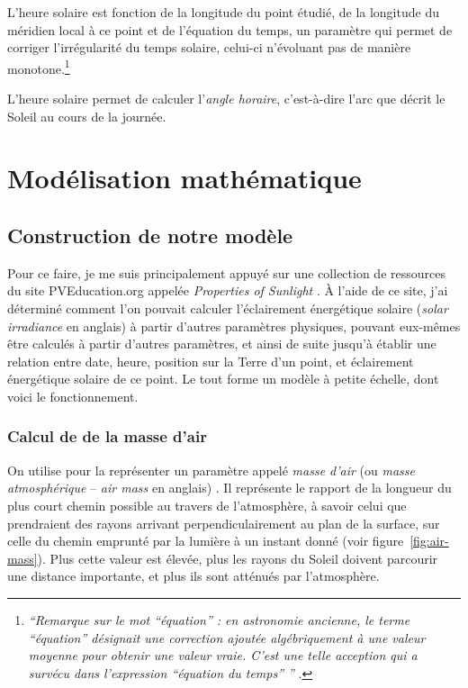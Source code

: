 \documentclass[12pt]{article}
\begin{document}
L'heure solaire est fonction de la longitude du point étudié, de la longitude du méridien local à ce point et de l'équation du temps, un paramètre qui permet de corriger l'irrégularité du temps solaire, celui-ci n'évoluant pas de manière monotone.\footnote{\textit{``Remarque sur le mot ``équation'' : en astronomie ancienne, le terme ``équation'' désignait une correction ajoutée algébriquement à une valeur moyenne pour obtenir une valeur vraie.
C'est une telle acception qui a survécu dans l'expression ``équation du temps'' ''} \cite{equation_temps_wiki}.}

L'heure solaire permet de calculer l'\emph{angle horaire}, c'est-à-dire l'arc que décrit le Soleil au cours de la journée.



\clearpage
\section{Modélisation mathématique}
\subsection{Construction de notre modèle}

Pour ce faire, je me suis principalement appuyé sur une collection de ressources du site PVEducation.org appelée \emph{Properties of Sunlight} \cite{properties_of_sunlight}.
À l'aide de ce site, j'ai déterminé comment l'on pouvait calculer l'éclairement énergétique solaire (\textit{solar irradiance} en anglais) à partir d'autres paramètres physiques, pouvant eux-mêmes être calculés à partir d'autres paramètres, et ainsi de suite jusqu'à établir une relation entre date, heure, position sur la Terre d'un point, et éclairement énergétique solaire de ce point.
Le tout forme un modèle à petite échelle, dont voici le fonctionnement.

\subsubsection{Calcul de de la masse d'air}


On utilise pour la représenter un paramètre appelé \emph{masse d'air} (ou \emph{masse atmosphérique} -- \textit{air mass} en anglais) \cite{air_mass_wiki}.
Il représente le rapport de la longueur du plus court chemin possible au travers de l'atmosphère, à savoir celui que prendraient des rayons arrivant perpendiculairement au plan de la surface, sur celle du chemin emprunté par la lumière à un instant donné (voir figure~\ref{fig:air-mass}).
Plus cette valeur est élevée, plus les rayons du Soleil doivent parcourir une distance importante, et plus ils sont atténués par l'atmosphère.
\end{document}
